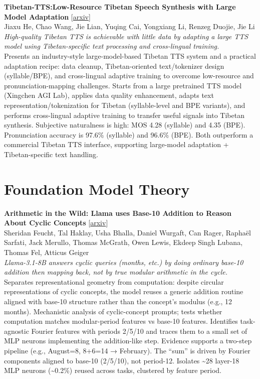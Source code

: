 \documentclass[12pt,letterpaper]{article}
\begin{document}
\medskip

{\small\textbf{Tibetan-TTS:Low-Resource Tibetan Speech Synthesis with Large Model Adaptation}} {\scriptsize[\href{https://arxiv.org/abs/2605.02496}{arxiv}]}\\
{\scriptsize Jiaxu He, Chao Wang, Jie Lian, Yuqing Cai, Yongxiang Li, Renzeg Duojie, Jie Li}\\

{\small\textit{High-quality Tibetan TTS is achievable with little data by adapting a large TTS model using Tibetan-specific text processing and cross-lingual training.}}\\[1pt]
{\footnotesize Presents an industry-style large-model-based Tibetan TTS system and a practical adaptation recipe: data cleanup, Tibetan-oriented text/tokenizer design (syllable/BPE), and cross-lingual adaptive training to overcome low-resource and pronunciation-mapping challenges. Starts from a large pretrained TTS model (Xingchen AGI Lab), applies data quality enhancement, adapts text representation/tokenization for Tibetan (syllable-level and BPE variants), and performs cross-lingual adaptive training to transfer useful signals into Tibetan synthesis. Subjective naturalness is high: MOS 4.28 (syllable) and 4.35 (BPE). Pronunciation accuracy is 97.6\% (syllable) and 96.6\% (BPE). Both outperform a commercial Tibetan TTS interface, supporting large-model adaptation + Tibetan-specific text handling.}

\medskip


\section*{Foundation Model Theory}

{\small\textbf{Arithmetic in the Wild: Llama uses Base-10 Addition to Reason About Cyclic Concepts}} {\scriptsize[\href{https://arxiv.org/abs/2605.01148}{arxiv}]}\\
{\scriptsize Sheridan Feucht, Tal Haklay, Usha Bhalla, Daniel Wurgaft, Can Rager, Rapha\"el Sarfati, Jack Merullo, Thomas McGrath, Owen Lewis, Ekdeep Singh Lubana, Thomas Fel, Atticus Geiger}\\

{\small\textit{Llama-3.1-8B answers cyclic queries (months, etc.) by doing ordinary base-10 addition then mapping back, not by true modular arithmetic in the cycle.}}\\[1pt]
{\footnotesize Separates representational geometry from computation: despite circular representations of cyclic concepts, the model reuses a generic addition routine aligned with base-10 structure rather than the concept's modulus (e.g., 12 months). Mechanistic analysis of cyclic-concept prompts; tests whether computation matches modular-period features vs base-10 features. Identifies task-agnostic Fourier features with periods 2/5/10 and traces them to a small set of MLP neurons implementing the addition-like step. Evidence supports a two-step pipeline (e.g., August=8, 8+6=14 → February). The ``sum'' is driven by Fourier components aligned to base-10 (2/5/10), not period-12. Isolates \textasciitilde{}28 layer-18 MLP neurons (\textasciitilde{}0.2\%) reused across tasks, clustered by feature period.}
\end{document}
